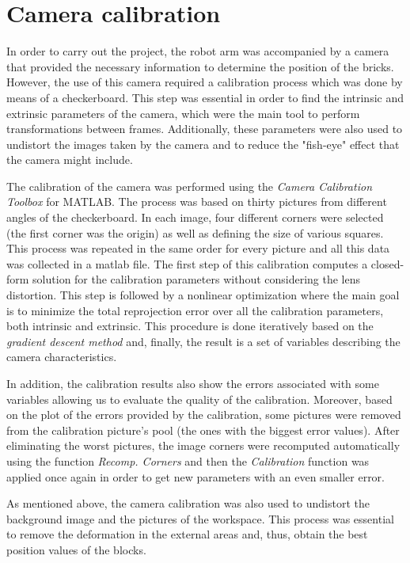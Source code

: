 \section{Camera calibration}\label{ch:calibration}

In order to carry out the project, the robot arm was accompanied by a camera that provided the necessary information to determine the position of the bricks. However, the use of this camera required a calibration process which was done by means of a checkerboard. This step was essential in order to find the intrinsic and extrinsic parameters of the camera, which were the main tool to perform transformations between frames. Additionally, these parameters were also used to undistort the images taken by the camera and to reduce the "fish-eye" effect that the camera might include.

The calibration of the camera was performed using the \textit{Camera Calibration Toolbox} for MATLAB. The process was based on thirty pictures from different angles of the checkerboard. In each image, four different corners were selected (the first corner was the origin) as well as defining the size of various squares. This process was repeated in the same order for every picture and all this data was collected in a matlab file. The first step of this calibration computes a closed-form solution for the calibration parameters without considering the lens distortion. This step is followed by a nonlinear optimization where the main goal is to minimize the total reprojection error over all the calibration parameters, both intrinsic and extrinsic. This procedure is done iteratively based on the \textit{gradient descent method} and, finally, the result is a set of variables describing the camera characteristics. 

In addition, the calibration results also show the errors associated with some variables allowing us to evaluate the quality of the calibration. Moreover, based on the plot of the errors provided by the calibration, some pictures were removed from the calibration picture's pool (the ones with the biggest error values). After eliminating the worst pictures, the image corners were recomputed automatically using the function \textit{Recomp. Corners} and then the \textit{Calibration} function was applied once again in order to get new parameters with an even smaller error.

As mentioned above, the camera calibration was also used to undistort the background image and the pictures of the workspace. This process was essential to remove the deformation in the external areas and, thus, obtain the best position values of the blocks. \par


